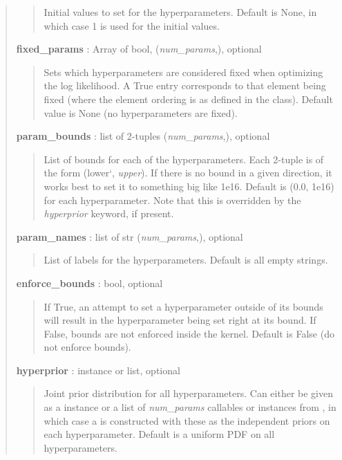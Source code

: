 \documentclass[letterpaper,10pt,english]{sphinxmanual}
\begin{document}
\begin{fulllineitems}
\begin{quote}
\begin{description}
\begin{quote}
Initial values to set for the hyperparameters. Default is None, in
which case 1 is used for the initial values.
\end{quote}

\textbf{fixed\_params} : Array of bool, (\emph{num\_params},), optional
\begin{quote}

Sets which hyperparameters are considered fixed when optimizing the log
likelihood. A True entry corresponds to that element being
fixed (where the element ordering is as defined in the class).
Default value is None (no hyperparameters are fixed).
\end{quote}

\textbf{param\_bounds} : list of 2-tuples (\emph{num\_params},), optional
\begin{quote}

List of bounds for each of the hyperparameters. Each 2-tuple is of the
form (lower{}`, \emph{upper}). If there is no bound in a given direction, it
works best to set it to something big like 1e16. Default is (0.0, 1e16)
for each hyperparameter. Note that this is overridden by the \emph{hyperprior}
keyword, if present.
\end{quote}

\textbf{param\_names} : list of str (\emph{num\_params},), optional
\begin{quote}

List of labels for the hyperparameters. Default is all empty strings.
\end{quote}

\textbf{enforce\_bounds} : bool, optional
\begin{quote}

If True, an attempt to set a hyperparameter outside of its bounds will
result in the hyperparameter being set right at its bound. If False,
bounds are not enforced inside the kernel. Default is False (do not
enforce bounds).
\end{quote}

\textbf{hyperprior} :  instance or list, optional
\begin{quote}

Joint prior distribution for all hyperparameters. Can either be given
as a  instance or a list of \emph{num\_params}
callables or  instances from ,
in which case a  is constructed with
these as the independent priors on each hyperparameter. Default is a
uniform PDF on all hyperparameters.
\end{quote}


\end{description}
\end{quote}
\end{fulllineitems}
\end{document}
